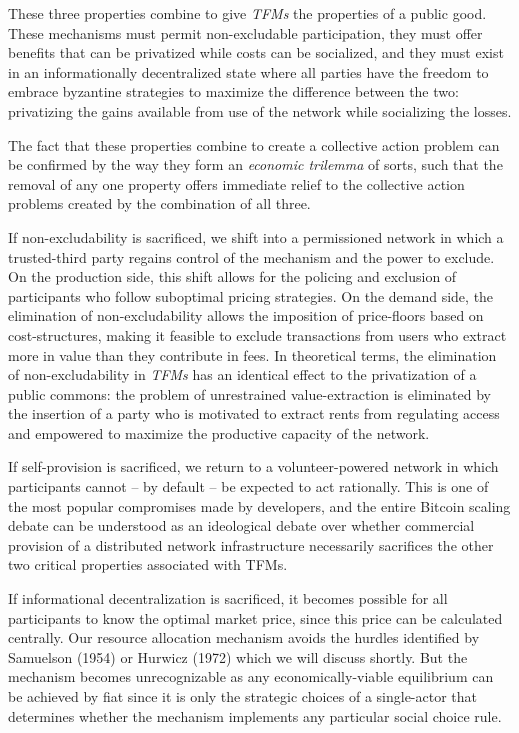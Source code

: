 \documentclass[sigconf,anonymous]{aamas}
\begin{document}
These three properties combine to give \textit{TFMs} the properties of a public good. These mechanisms must permit non-excludable participation, they must offer benefits that can be privatized while costs can be socialized, and they must exist in an informationally decentralized state where all parties have the freedom to embrace byzantine strategies to maximize the difference between the two: privatizing the gains available from use of the network while socializing the losses. 

The fact that these properties combine to create a collective action problem can be confirmed by the way they form an \textit{economic trilemma} of sorts, such that the removal of any one property offers immediate relief to the collective action problems created by the combination of all three.

If non-excludability is sacrificed, we shift into a permissioned network in which a trusted-third party regains control of the mechanism and the power to exclude. On the production side, this shift allows for the policing and exclusion of participants who follow suboptimal pricing strategies. On the demand side, the elimination of non-excludability allows the imposition of price-floors based on cost-structures, making it feasible to exclude transactions from users who extract more in value than they contribute in fees. In theoretical terms, the elimination of non-excludability in \textit{TFMs} has an identical effect to the privatization of a public commons: the problem of unrestrained value-extraction is eliminated by the insertion of a party who is motivated to extract rents from regulating access and empowered to maximize the productive capacity of the network.

If self-provision is sacrificed, we return to a volunteer-powered network in which participants cannot -- by default -- be expected to act rationally. This is one of the most popular compromises made by developers, and the entire Bitcoin scaling debate can be understood as an ideological debate over whether commercial provision of a distributed network infrastructure necessarily sacrifices the other two critical properties associated with TFMs.

If informational decentralization is sacrificed, it becomes possible for all participants to know the optimal market price, since this price can be calculated centrally. Our resource allocation mechanism avoids the hurdles identified by Samuelson (1954) or Hurwicz (1972) which we will discuss shortly. But the mechanism becomes unrecognizable as any economically-viable equilibrium can be achieved by fiat since it is only the strategic choices of a single-actor that determines whether the mechanism implements any particular social choice rule.
\end{document}
